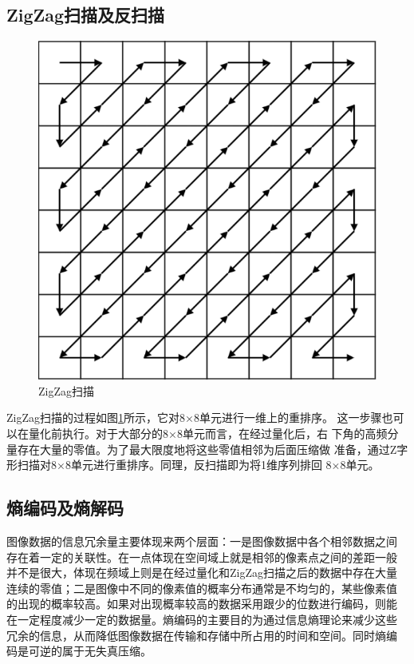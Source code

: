 \documentclass{article}
\numberwithin {equation}{section}
\begin{document}
\begin{spacing}{1.25}
  \subsection{ZigZag扫描及反扫描}
    \vspace{1em}
    \begin{figure}[H]
      \centering
      \includegraphics[scale=0.8]{./pictures/zigzag.png}
    \caption{ZigZag扫描}\label{zigzag}
    \end{figure}
    ZigZag扫描的过程如图\ref{zigzag}所示，它对8×8单元进行一维上的重排序。
    这一步骤也可以在量化前执行。对于大部分的8×8单元而言，在经过量化后，右
    下角的高频分量存在大量的零值。为了最大限度地将这些零值相邻为后面压缩做
    准备，通过Z字形扫描对8×8单元进行重排序。同理，反扫描即为将1维序列排回
    8×8单元。
  \subsection{熵编码及熵解码}
    \vspace{1em}
    图像数据的信息冗余量主要体现来两个层面：一是图像数据中各个相邻数据之间
    存在着一定的关联性。在一点体现在空间域上就是相邻的像素点之间的差距一般
    并不是很大，体现在频域上则是在经过量化和ZigZag扫描之后的数据中存在大量
    连续的零值；二是图像中不同的像素值的概率分布通常是不均匀的，某些像素值
    的出现的概率较高。如果对出现概率较高的数据采用跟少的位数进行编码，则能
    在一定程度减少一定的数据量。熵编码的主要目的为通过信息熵理论来减少这些
    冗余的信息，从而降低图像数据在传输和存储中所占用的时间和空间。同时熵编
    码是可逆的属于无失真压缩。


\end{spacing}
\end{document}
